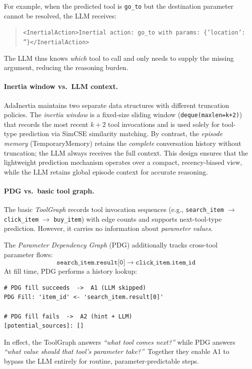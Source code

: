 \documentclass[runningheads]{llncs}
\begin{document}
\noindent
For example, when the predicted tool is \texttt{go\_to} but the destination parameter cannot be resolved, the LLM receives:
\begin{quote}
\texttt{\textless InertialAction\textgreater Inertial action: go\_to with params: \{'location': ''\}\textless /InertialAction\textgreater}
\end{quote}
The LLM thus knows \emph{which} tool to call and only needs to supply the missing argument, reducing the reasoning burden.

\paragraph{Inertia window vs.\ LLM context.}
AdaInertia maintains two separate data structures with different truncation policies. The \emph{inertia window} is a fixed-size sliding window (\texttt{deque(maxlen=k+2)}) that records the most recent $k{+}2$ tool invocations and is used solely for tool-type prediction via SimCSE similarity matching. By contrast, the \emph{episode memory} (TemporaryMemory) retains the \emph{complete} conversation history without truncation; the LLM always receives the full context. This design ensures that the lightweight prediction mechanism operates over a compact, recency-biased view, while the LLM retains global episode context for accurate reasoning.

\paragraph{PDG vs.\ basic tool graph.}
The basic \emph{ToolGraph} records tool invocation sequences (e.g., \texttt{search\_item} $\to$ \texttt{click\_item} $\to$ \texttt{buy\_item}) with edge counts and supports next-tool-type prediction. However, it carries no information about \emph{parameter values}.

The \emph{Parameter Dependency Graph} (PDG) additionally tracks cross-tool parameter flows:
\[
  \texttt{search\_item.result[0]} \;\longrightarrow\; \texttt{click\_item.item\_id}
\]
At fill time, PDG performs a history lookup:
\begin{lstlisting}[basicstyle=\small\ttfamily, frame=single]
# PDG fill succeeds  ->  A1 (LLM skipped)
PDG Fill: 'item_id' <- 'search_item.result[0]'

# PDG fill fails  ->  A2 (hint + LLM)
[potential_sources]: []
\end{lstlisting}
In effect, the ToolGraph answers \emph{``what tool comes next?''} while PDG answers \emph{``what value should that tool's parameter take?''}\ Together they enable A1 to bypass the LLM entirely for routine, parameter-predictable steps.
\end{document}
